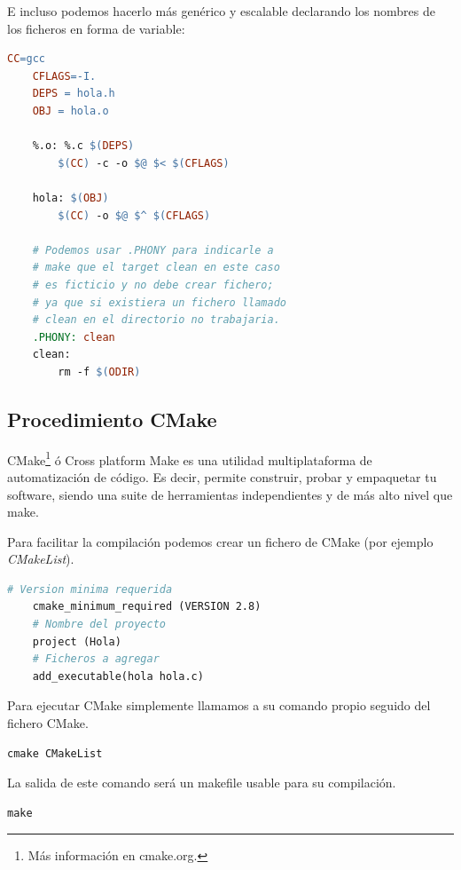\documentclass[a4paper, 11pt, titlepage]{article}
\begin{document}
    E incluso podemos hacerlo más genérico y escalable declarando los nombres de los ficheros 
    en forma de variable:

    \begin{lstlisting}[language=make]
    CC=gcc
    CFLAGS=-I.
    DEPS = hola.h
    OBJ = hola.o 
    
    %.o: %.c $(DEPS)
        $(CC) -c -o $@ $< $(CFLAGS)
    
    hola: $(OBJ)
        $(CC) -o $@ $^ $(CFLAGS)
    
    # Podemos usar .PHONY para indicarle a 
    # make que el target clean en este caso 
    # es ficticio y no debe crear fichero; 
    # ya que si existiera un fichero llamado 
    # clean en el directorio no trabajaria.
    .PHONY: clean
    clean: 
        rm -f $(ODIR)\end{lstlisting}

    \subsection{Procedimiento CMake}

        CMake\footnote{
            Más información en cmake.org.
        } ó Cross platform Make es una utilidad multiplataforma de automatización de código.
        Es decir, permite construir, probar y empaquetar tu software, siendo una suite de herramientas 
        independientes y de más alto nivel que make.

        Para facilitar la compilación podemos crear un fichero de CMake (por ejemplo \textit{CMakeList}).

        \begin{lstlisting}[language=make]
    # Version minima requerida
    cmake_minimum_required (VERSION 2.8)
    # Nombre del proyecto
    project (Hola)
    # Ficheros a agregar
    add_executable(hola hola.c)\end{lstlisting}
    
        Para ejecutar CMake simplemente llamamos a su comando propio seguido del fichero CMake.

        \begin{lstlisting}[language=make]
    cmake CMakeList\end{lstlisting}

        La salida de este comando será un makefile usable para su compilación.

        \begin{lstlisting}[language=make]
    make\end{lstlisting}
\end{document}
